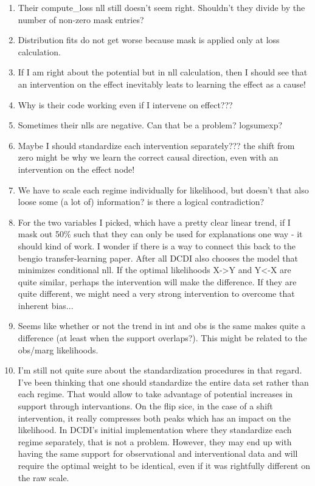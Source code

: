 \documentclass{article}
\begin{document}
\begin{enumerate}
    \item Their compute\_loss nll still doesn't seem right. Shouldn't they divide by the number of non-zero mask entries?
    \item Distribution fits do not get worse because mask is applied only at loss calculation.
    \item If I am right about the potential but in nll calculation, then I should see that an intervention on the effect inevitably leats to learning the effect as a cause!
    \item Why is their code working even if I intervene on effect???
    \item Sometimes their nlls are negative. Can that be a problem? logsumexp?
    \item Maybe I should standardize each intervention separately??? the shift from zero might be why we learn the correct causal direction, even with an intervention on the effect node!
    \item We have to scale each regime individually for likelihood, but doesn't that also loose some (a lot of) information? is there a logical contradiction?
    \item For the two variables I picked, which have a pretty clear linear trend, if I mask out 50\% such that they can only be used for explanations one way - it should kind of work. I wonder if  there is a way to connect this back to the bengio transfer-learning paper. After all DCDI also chooses the model that minimizes conditional nll. If the optimal likelihoods X->Y and Y<-X are quite similar, perhaps the intervention will make the difference. If they are quite different, we might need a very strong intervention to overcome that inherent bias...
    \item Seems like whether or not the trend in int and obs is the same makes quite a difference (at least when the support overlaps?). This might be related to the obs/marg likelihoods.
    \item I'm still not quite sure about the standardization procedures in that regard. I've been thinking that one should standardize the entire data set rather than each regime. That would allow to take advantage of potential increases in support through intervantions. On the flip sice, in the case of a shift intervention, it really compresses both peaks which has an impact on the likelihood.
    In DCDI's initial implementation where they standardize each regime separately, that is not a problem. However, they may end up with having the same support for observational and interventional data and will require the optimal weight to be identical, even if it was rightfully different on the raw scale.

\end{enumerate}
\end{document}
